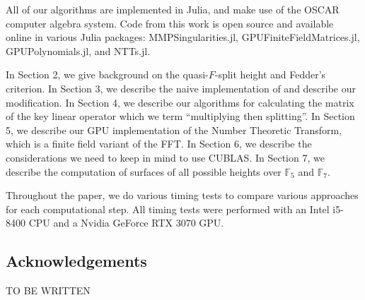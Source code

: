 All of our algorithms are implemented in Julia, and
make use of the OSCAR computer algebra system.
Code from this work is open source and available online 
in various
Julia packages: MMPSingularities.jl,
GPUFiniteFieldMatrices.jl, GPUPolynomials.jl,
and NTTs.jl.

In Section 2, we give background on the quasi-\(F\)-split height
and Fedder's criterion.
In Section 3, we describe the naive implementation of
\cite[Theorem~C]{kty-2022-fedder} and describe
our modification.
In Section 4, we describe our algorithms for calculating the matrix
of the key linear operator which we term ``multiplying then splitting''.
In Section 5, we describe our GPU implementation of the Number Theoretic
Transform, which is a finite field variant of the FFT.
In Section 6, we describe the considerations we need to keep in mind
to use CUBLAS.
In Section 7, we describe the computation of surfaces of all possible
heights over \(\mathbb{F}_{5}\) and \(\mathbb{F}_{7}\).


Throughout the paper, we do various timing tests to compare various
approaches for each computational step.
All timing tests were performed with 
an Intel i5-8400 CPU and a Nvidia GeForce RTX 3070 GPU.

\subsection{Acknowledgements}

TO BE WRITTEN

